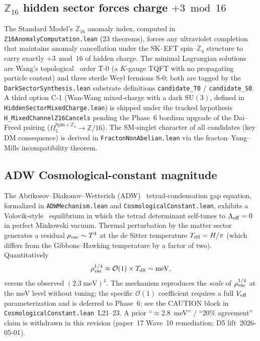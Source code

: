 \documentclass[aps,prd,reprint,nofootinbib,superscriptaddress]{revtex4-2}
\begin{document}
\subsection{$\mathbb{Z}_{16}$ hidden sector forces charge $+3 \bmod 16$}
\label{subsec:z16}

The Standard Model's $\mathbb{Z}_{16}$ anomaly index, computed in
\texttt{Z16AnomalyComputation.lean} (23 theorems), forces any
ultraviolet completion that maintains anomaly cancellation under the
SK--EFT spin--$\mathbb{Z}_4$ structure to carry exactly $+3 \bmod 16$ of
hidden charge. The minimal Lagrangian solutions are Wang's topological~\cite{Wan2019}
order T-0 (a $K$-gauge TQFT with no propagating particle content) and
three sterile Weyl fermions S-0; both are tagged by the
\texttt{DarkSectorSynthesis.lean} substrate definitions
\texttt{candidate\_T0} / \texttt{candidate\_S0}. A third option C-1
(Wan-Wang mixed-charge with a dark $\text{SU}(3)$, defined in
\texttt{HiddenSectorMixedCharge.lean}) is shipped under the
tracked hypothesis \texttt{H\_MixedChannelZ16Cancels} pending the Phase~6
bordism upgrade of the Dai--Freed pairing
($\Omega_5^{\text{Spin}\times\mathbb{Z}_4} \to \mathbb{Z}/16$). The
SM-singlet character of all candidates (key DM consequence) is derived
in \texttt{FractonNonAbelian.lean} via the fracton--Yang--Mills
incompatibility theorem.

\subsection{ADW Cosmological-constant magnitude}
\label{subsec:adw-cc}

The Abrikosov--Diakonov--Wetterich (ADW)~\cite{ADW2019,Diakonov2011,Vergeles2025} tetrad-condensation gap
equation, formalized in \texttt{ADWMechanism.lean} and
\texttt{CosmologicalConstant.lean}, exhibits a Volovik-style~\cite{Volovik2006,KV2008} equilibrium
in which the tetrad determinant self-tunes to $\Lambda_{\rm eff} = 0$ in
perfect Minkowski vacuum. Thermal perturbation by the matter sector
generates a residual $\rho_{\rm vac} \sim T^4$ at the de Sitter
temperature $T_{\rm dS} = H/\pi$ (which differs from the Gibbons--Hawking
temperature by a factor of two). Quantitatively
\begin{equation}
\rho_{\rm vac}^{1/4} \approx \mathcal{O}(1) \times T_{\rm dS}
\sim \SI{}{\milli\electronvolt},
\end{equation}
versus the observed $(\SI{2.3}{\milli\electronvolt})^4$. The mechanism
reproduces the \emph{scale} of $\rho_{\rm vac}^{1/4}$ at the meV level
without tuning; the specific $\mathcal{O}(1)$ coefficient requires a
full $V_{\rm eff}$ parameterization and is deferred to Phase~6;
see the CAUTION block in \texttt{CosmologicalConstant.lean}~L21--23. A
prior ``$\approx 2.8$~meV'' / ``$20\%$ agreement'' claim is withdrawn
in this revision (paper~17 Wave~10 remediation; D5 lift~2026-05-01).
\end{document}

